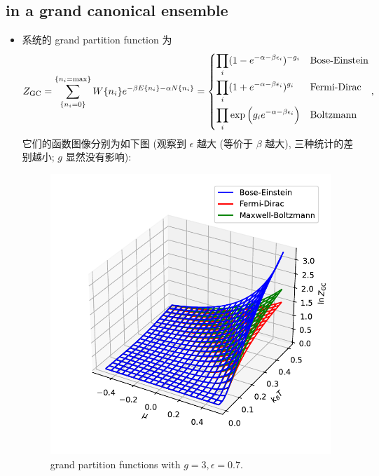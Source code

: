 \subsection{in a grand canonical ensemble}
\begin{itemize}
	\item 系统的 grand partition function 为
	\begin{equation}
		Z_\text{GC} = \sum_{\{n_i = 0\}}^{\{n_i = \text{max}\}} W\{n_i\} e^{- \beta E\{n_i\} - \alpha N\{n_i\}} = \begin{dcases}
			\prod_i (1 - e^{- \alpha - \beta \epsilon_i})^{- g_i} & \text{Bose-Einstein} \\
			\prod_i (1 + e^{- \alpha - \beta \epsilon_i})^{g_i} & \text{Fermi-Dirac} \\
			\prod_i \exp \Big( g_i e^{- \alpha - \beta \epsilon_i} \Big) & \text{Boltzmann}
		\end{dcases},
	\end{equation}
	它们的函数图像分别为如下图 (观察到 $\epsilon$ 越大 (等价于 $\beta$ 越大), 三种统计的差别越小; $g$ 显然没有影响):
	
	\begin{figure}[H]
		\centering
		\includegraphics[scale=0.75]{figures/grand partition functions with g = 3, epsilon = 0.7.pdf}
		\caption{grand partition functions with $g = 3, \epsilon = 0.7$.}
	\end{figure}
	

\end{itemize}
